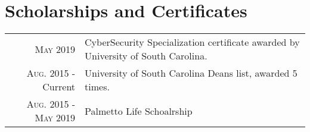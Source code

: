 \documentclass[a4paper,10pt]{article}
\begin{document}
\section{Scholarships and Certificates}
\begin{tabular}{r|l}
 \textsc{May} 2019  & CyberSecurity Specialization certificate awarded by University of South Carolina. \\
  \textsc{Aug.} 2015 - Current  & University of South Carolina Deans list, awarded 5 times.\\
 \textsc{Aug.} 2015 - \textsc{May} 2019   & Palmetto Life Schoalrship\normalsize


\end{tabular}

\end{document}
